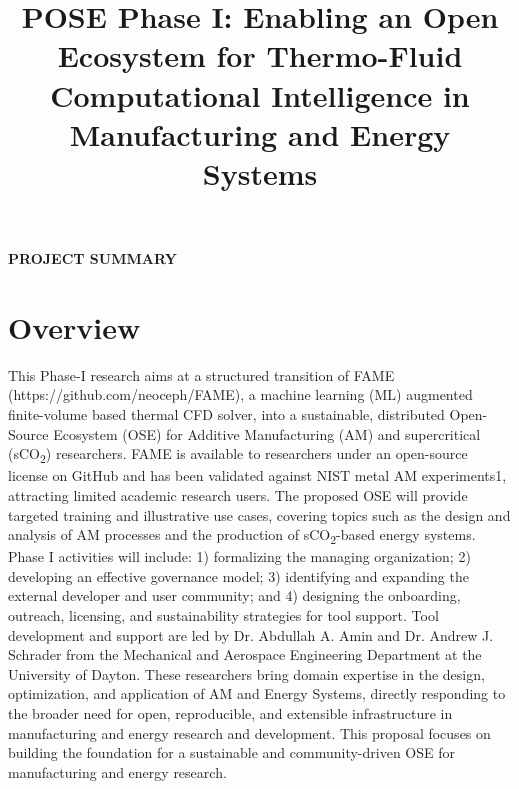 \documentclass[11pt]{article}
\title{
    \vspace{-45pt}
    \fontsize{15pt}{18pt}\selectfont
    \textcolor{FlyersRed}
    {\textbf{POSE Phase I}: Enabling an Open Ecosystem for Thermo-Fluid Computational Intelligence in Manufacturing and Energy Systems}
}
\date{}
\author{}
\newcommand{\CO}[1]{CO\textsubscript{#1}}
\begin{document}
\pagestyle{empty} %
\vspace{-4\baselineskip}
\begin{center}
    \Large\textbf{\textcolor{FlyersRed}{PROJECT SUMMARY}}
\end{center}
\vspace{-1.4\baselineskip}


\section*{Overview}
\vspace{-3pt}
\noindent
This Phase-I research aims at a structured transition of FAME (https://github.com/neoceph/FAME), a machine learning (ML) augmented finite-volume based thermal CFD solver, into a sustainable, distributed Open-Source Ecosystem (OSE) for Additive Manufacturing (AM) and supercritical (s\CO{2})  researchers. FAME is available to researchers under an open-source license on GitHub and has been validated against NIST metal AM experiments1, attracting limited academic research users. The proposed OSE will provide targeted training and illustrative use cases, covering topics such as the design and analysis of AM processes and the production of s\CO{2}-based energy systems. Phase I activities will include: 1) formalizing the managing organization; 2) developing an effective governance model; 3) identifying and expanding the external developer and user community; and 4) designing the onboarding, outreach, licensing, and sustainability strategies for tool support. Tool development and support are led by Dr. Abdullah A. Amin and Dr. Andrew J. Schrader from the Mechanical and Aerospace Engineering Department at the University of Dayton. These researchers bring domain expertise in the design, optimization, and application of AM and Energy Systems, directly responding to the broader need for open, reproducible, and extensible infrastructure in manufacturing and energy research and development. This proposal focuses on building the foundation for a sustainable and community-driven OSE for manufacturing and energy research.
%
\vspace{-3pt}
\end{document}
